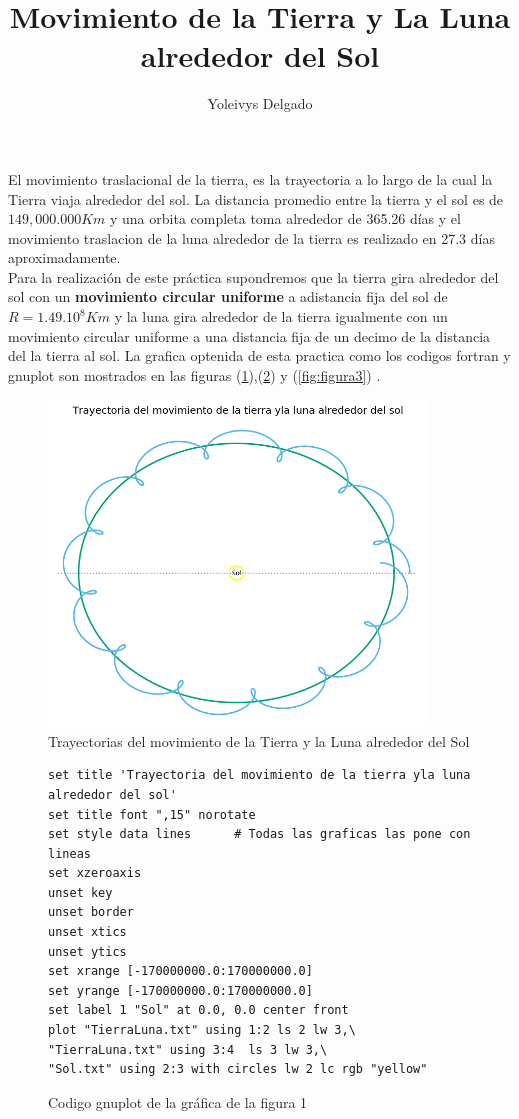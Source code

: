 \documentclass[12pt,a4paper,twoside]{article}
\author{Yoleivys Delgado}
\title{\textbf{Movimiento de la Tierra y La Luna alrededor del Sol}}
\begin{document}
\maketitle
El movimiento traslacional de la tierra, es la trayectoria a lo largo de la cual la Tierra viaja alrededor del sol. La distancia promedio entre la tierra y el sol es de $149,000.000 Km$ y una orbita completa toma alrededor de 365.26 días y el movimiento traslacion de la luna alrededor de la tierra es realizado en 27.3 días aproximadamente.\\
Para la realización de este práctica supondremos que la tierra gira alrededor del sol con un \textbf{movimiento circular uniforme } a adistancia fija del sol de $R = 1.49 . 10^{8} Km $ y la luna gira alrededor de la tierra igualmente con un movimiento circular uniforme a una distancia fija de un decimo de la distancia del la tierra al sol.
La grafica optenida de esta practica como los codigos fortran y gnuplot son mostrados en las figuras (\ref{fig:figura1}),(\ref{fig:figura2}) y (\ref{fig:figura3}) . 

\begin{figure}[h]
\centering
\includegraphics[width=10cm]{imagen.png} 
\caption{Trayectorias del movimiento de la Tierra y la Luna alrededor del Sol}
\label{fig:figura1}
\end{figure}

\newpage
\begin{figure}[h]
\begin{verbatim}
set title 'Trayectoria del movimiento de la tierra yla luna alrededor del sol'
set title font ",15" norotate
set style data lines      # Todas las graficas las pone con lineas
set xzeroaxis
unset key
unset border
unset xtics
unset ytics
set xrange [-170000000.0:170000000.0]
set yrange [-170000000.0:170000000.0]
set label 1 "Sol" at 0.0, 0.0 center front
plot "TierraLuna.txt" using 1:2 ls 2 lw 3,\
"TierraLuna.txt" using 3:4  ls 3 lw 3,\
"Sol.txt" using 2:3 with circles lw 2 lc rgb "yellow"
\end{verbatim}
\caption{Codigo gnuplot de la gráfica de la figura 1}
\label{fig:figura2}
\end{figure}
\end{document}
